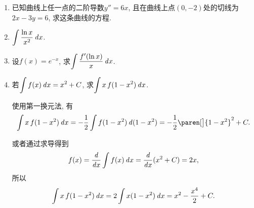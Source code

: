 \documentclass[a4paper,punct=CCT]{ctexbook}
\newcommand*{\mreason}[1]{#1}
\newcommand*{\disp}[1]{\( \displaystyle #1 \)}
\theoremstyle{definition}
\theoremstyle{remark}
\newif\ifshowsol
\begin{document}
\begin{enumerate}
\item 已知曲线上任一点的二阶导数\(y'' = 6x\), 且在曲线上点\((0, -2)\)处的切线为\(2x - 3y = 6\), 求这条曲线的方程.

  \ifshowsol
  将切线的方程化为点斜式, 得到\(y = 2x/3 - 2\), 所以\(y'\big\vert_{x=0} = 2/3\)．有
  \[
    y' = \int y'' \dx = \int 6x \dx = 3x^2 + c_1,
  \]
  所以\(c_1 = 2/3\). 又有
  \[
    y = \int y' \dx = \int \paren[\Big]{3x^2 + \frac23} \dx = x^3 + \frac23 x + c_2,
  \]
  所以\(c_2 = -2\)．这条曲线的方程是
  \[
    y = x^3 + \frac23 x - 2.
  \]
  \fi

\item \disp{\int \frac{\ln x}{x^2} \dx}.

  \ifshowsol
  最好的办法是用\(x = e^t\)换元后用分部积分法, 可惜这里还没学到．有
  \begin{align*}
    \int \frac{\ln x}{x^2} \dx
    &= \int t e^{-t} \dt
    && \mreason{x = e^t} \\
    &= - \int t \diff e^{-t} \\
    &= - \paren[\Big]{t e^{-t} - \int e^{-t} \dt} \\
    &= - t e^{-t} - e^{-t} + C \\
    &= - \frac{\ln x}{x} - \frac1x + C.
  \end{align*}
  \fi

\item 设\(f(x) = e^{-x}\), 求\disp{\int \frac{f'(\ln x)}{x} \dx}.

  \ifshowsol
  使用第一换元法, 有
  \begin{equation*}
    \int \frac{f'(\ln x)}{x} \dx
    = \int f'(\ln x) \diff (\ln x)
    = f(\ln x) = \frac1x + C.
  \end{equation*}

  也可以直接求导\(f'(x) = - e^{-x}\), 然后直接代入, 有
  \begin{equation*}
    \int \frac{f'(\ln x)}{x} \dx
    = - \int \frac{1}{x^2} \dx
    = \frac1x + C.
  \end{equation*}
  \fi

\item 若\disp{\int f(x) \dx = x^2 + C}, 求\disp{\int x \, f(1-x^2) \dx}.

  \ifshowsol
  使用第一换元法, 有
  \begin{align*}
    \int x \, f(1-x^2) \dx
    = - \frac12 \int f(1-x^2) \diff (1-x^2)
    = - \frac12 \paren[\big]{1-x^2}^2 + C.
  \end{align*}

  或者通过求导得到
  \[
    f(x) = \frac{\mathop{}\!\mathit{d}}{\mathop{}\!\mathit{d} x} \int f(x) \mathop{}\!\mathit{d} x = \frac{\mathop{}\!\mathit{d}}{\mathop{}\!\mathit{d} x} (x^2 + C) = 2x,
  \]
  所以
  \[
    \int x \, f(1-x^2) \mathop{}\!\mathit{d} x
    = 2 \int x (1-x^2) \mathop{}\!\mathit{d} x
    = x^2 - \frac{x^4}{2} + C.
  \]


\end{enumerate}
\end{document}
